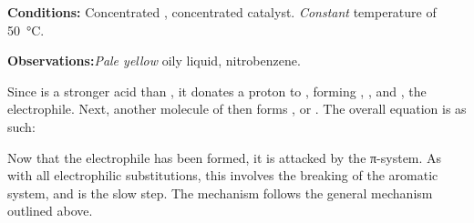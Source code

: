 	\vspace{1.5em}
	\vbox{\textbf{Conditions:}	\tabto{35mm}Concentrated , concentrated  catalyst.
								\tabto{35mm}\textit{Constant} temperature of \SI{50}{\celsius}.}\vspace{0.5em}

	\vbox{\textbf{Observations:}\tabto{35mm}\textit{\color{Goldenrod}Pale yellow} oily liquid, nitrobenzene.}


	\vspace{1.5em}

	Since  is a stronger acid than , it donates a proton to , forming , , and , the
	electrophile. Next, another molecule of  then forms , or . The overall equation is as such:



	\vspace{2.0em}

	Now that the electrophile  has been formed, it is attacked by the π-system. As with all electrophilic substitutions, this
	involves the breaking of the aromatic system, and is the slow step. The mechanism follows the general mechanism outlined above.






